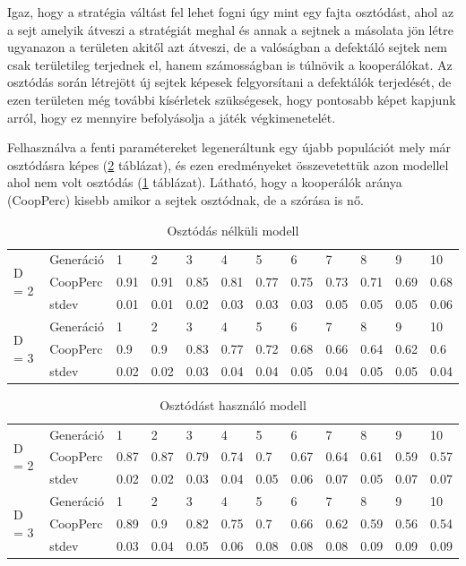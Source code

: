 Igaz, hogy a stratégia váltást fel lehet fogni úgy mint egy fajta osztódást, ahol az a sejt amelyik átveszi a stratégiát meghal és annak a sejtnek a másolata jön létre ugyanazon a területen akitől azt átveszi, de a valóságban a defektáló sejtek nem csak területileg terjednek el, hanem számosságban is túlnövik a kooperálókat.
Az osztódás során létrejött új sejtek képesek felgyorsítani a defektálók terjedését, de ezen területen még további kísérletek szükségesek, hogy pontosabb képet kapjunk arról, hogy ez mennyire befolyásolja a játék végkimenetelét.

Felhasználva a fenti paramétereket legeneráltunk egy újabb populációt mely már osztódásra képes (\ref{table:osztodik} táblázat), és ezen eredményeket összevetettük azon modellel ahol nem volt osztódás (\ref{table:nemOsztodik} táblázat). Látható, hogy a kooperálók aránya (CoopPerc) kisebb amikor a sejtek osztódnak, de a szórása is nő.

\begin{table}[htb]
	\centering
	\caption{Osztódás nélküli modell \label{table:nemOsztodik}}
	\begin{tabular}{ | l | l | l | l | l | l | l | l | l | l | l | l | }
		\hline
		\multirow{3}{*}{D = 2}
		& Generáció & 1 & 2 & 3 & 4 & 5 & 6 & 7 & 8 & 9 & 10 \\ \cline{2-12}
		& CoopPerc & 0.91 & 0.91 & 0.85 & 0.81 & 0.77 & 0.75 & 0.73 & 0.71 & 0.69 & 0.68 \\ \cline{2-12}
		& stdev & 0.01 & 0.01 & 0.02 & 0.03 & 0.03 & 0.03 & 0.05 & 0.05 & 0.05 & 0.06 \\ \hline
		\multirow{3}{*}{D = 3}
		& Generáció & 1 & 2 & 3 & 4 & 5 & 6 & 7 & 8 & 9 & 10 \\ \cline{2-12}
		& CoopPerc & 0.9 & 0.9 & 0.83 & 0.77 & 0.72 & 0.68 & 0.66 & 0.64 & 0.62 & 0.6 \\ \cline{2-12}
		& stdev & 0.02 & 0.02 & 0.03 & 0.04 & 0.04 & 0.05 & 0.04 & 0.05 & 0.05 & 0.04 \\ \hline
	\end{tabular}
\end{table}

\begin{table}[htb]
	\centering
	\caption{Osztódást használó modell}
	\label{table:osztodik}
	\begin{tabular}{ | l | l | l | l | l | l | l | l | l | l | l | l | }
		\hline
		\multirow{3}{*}{D = 2}
		& Generáció & 1 & 2 & 3 & 4 & 5 & 6 & 7 & 8 & 9 & 10 \\ \cline{2-12}
		& CoopPerc & 0.87 & 0.87 & 0.79 & 0.74 & 0.7 & 0.67 & 0.64 & 0.61 & 0.59 & 0.57 \\ \cline{2-12}
		& stdev & 0.02 & 0.02 & 0.03 & 0.04 & 0.05 & 0.06 & 0.07 & 0.05 & 0.07 & 0.07 \\ \hline
		\multirow{3}{*}{D = 3}
		& Generáció & 1 & 2 & 3 & 4 & 5 & 6 & 7 & 8 & 9 & 10 \\ \cline{2-12}
		& CoopPerc & 0.89 & 0.9 & 0.82 & 0.75 & 0.7 & 0.66 & 0.62 & 0.59 & 0.56 & 0.54 \\ \cline{2-12}
		& stdev & 0.03 & 0.04 & 0.05 & 0.06 & 0.08 & 0.08 & 0.08 & 0.09 & 0.09 & 0.09 \\ \hline
	\end{tabular}
\end{table}
